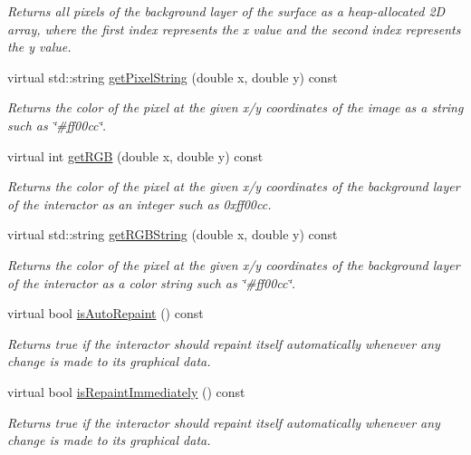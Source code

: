 \begin{DoxyCompactItemize}
\begin{DoxyCompactList}\small\item\em Returns all pixels of the background layer of the surface as a heap-\/allocated 2D array, where the first index represents the x value and the second index represents the y value. \end{DoxyCompactList}\item 
virtual std\+::string \mbox{\hyperlink{classsgl_1_1GDrawingSurface_a8da04ef488ec5fa498fbbffaf50928fd}{get\+Pixel\+String}} (double x, double y) const
\begin{DoxyCompactList}\small\item\em Returns the color of the pixel at the given x/y coordinates of the image as a string such as \char`\"{}\#ff00cc\char`\"{}. \end{DoxyCompactList}\item 
virtual int \mbox{\hyperlink{classsgl_1_1GDrawingSurface_a9e983467cf0c97cfd62433a8471570dc}{get\+R\+GB}} (double x, double y) const
\begin{DoxyCompactList}\small\item\em Returns the color of the pixel at the given x/y coordinates of the background layer of the interactor as an integer such as 0xff00cc. \end{DoxyCompactList}\item 
virtual std\+::string \mbox{\hyperlink{classsgl_1_1GDrawingSurface_a456d3582acc3544f37d939f5cb8802fe}{get\+R\+G\+B\+String}} (double x, double y) const
\begin{DoxyCompactList}\small\item\em Returns the color of the pixel at the given x/y coordinates of the background layer of the interactor as a color string such as \char`\"{}\#ff00cc\char`\"{}. \end{DoxyCompactList}\item 
virtual bool \mbox{\hyperlink{classsgl_1_1GDrawingSurface_a12c8d52ddfcaa5448ec4bace92ddee6c}{is\+Auto\+Repaint}} () const
\begin{DoxyCompactList}\small\item\em Returns true if the interactor should repaint itself automatically whenever any change is made to its graphical data. \end{DoxyCompactList}\item 
virtual bool \mbox{\hyperlink{classsgl_1_1GDrawingSurface_a82a00267c81cc0ae85ee0feb01a92fa8}{is\+Repaint\+Immediately}} () const
\begin{DoxyCompactList}\small\item\em Returns true if the interactor should repaint itself automatically whenever any change is made to its graphical data. \end{DoxyCompactList}\item 

\end{DoxyCompactItemize}
